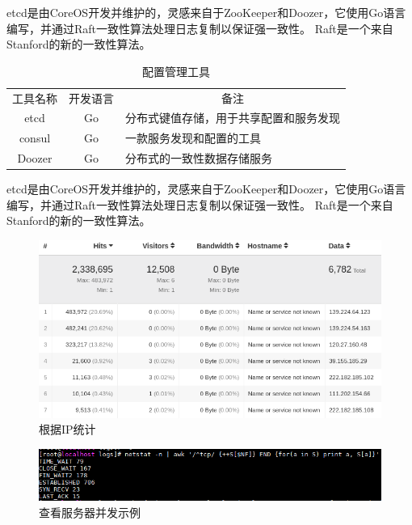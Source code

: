 \documentclass[8pt]{book}
\numberwithin{dummy}{section}
\theoremstyle{ocrenumbox}
\theoremstyle{blacknumex}
\theoremstyle{blacknumbox}
\theoremstyle{ocrenum}
\begin{document}
etcd是由CoreOS开发并维护的，灵感来自于ZooKeeper和Doozer，它使用Go语言编写，并通过Raft一致性算法处理日志复制以保证强一致性。 Raft是一个来自Stanford的新的一致性算法。


\begin{table}[htbp]
	\caption{配置管理工具}
	\label{table:configmanagementtool}
	\begin{center}
		\begin{tabular}{|c|c|p{8cm}|}
			\hline
			\multirow{1}{*}{工具名称}
			& \multicolumn{1}{c|}{开发语言} 
			& \multicolumn{1}{c|}{备注}\\			
			\cline{1-3}
			etcd &  Go  & 分布式键值存储，用于共享配置和服务发现 \\
			\hline
			consul & Go &  一款服务发现和配置的工具 \\
			\hline
			Doozer & Go & 分布式的一致性数据存储服务 \\
			\hline							
		\end{tabular}	
	\end{center}
\end{table}

etcd是由CoreOS开发并维护的，灵感来自于ZooKeeper和Doozer，它使用Go语言编写，并通过Raft一致性算法处理日志复制以保证强一致性。 Raft是一个来自Stanford的新的一致性算法。



\begin{figure}[htbp]
	\centering
	\includegraphics[scale=0.4]{ipstatistics.png}
	\caption{根据IP统计}
	\label{fig:ipstatistics}
\end{figure}


\begin{figure}[htbp]
	\centering
	\includegraphics[scale=0.5]{websiteconcurrentaccess.png}
	\caption{查看服务器并发示例}
	\label{fig:websiteconcurrentaccess}
\end{figure}
\end{document}
